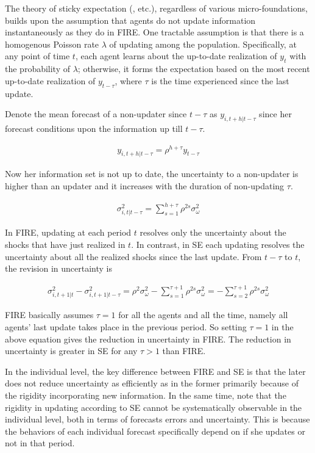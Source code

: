 \documentclass[12pt]{article}
\begin{document}
	The theory of sticky expectation (\citet{mankiw2002sticky}, \citet{carroll2003macroeconomic} etc.), regardless of various micro-foundations, builds upon the assumption that agents do not update information instantaneously as they do in FIRE. One tractable assumption is that there is a homogenous Poisson rate $\lambda$ of updating among the population. Specifically, at any point of time $t$, each agent learns about the up-to-date realization of $y_t$ with the probability of $\lambda$; otherwise, it forms the expectation based on the most recent up-to-date realization of $y_{t-\tau}$, where $\tau$ is the time experienced since the last update. 
	
	Denote the mean forecast of a non-updater since $t-\tau$ as $y_{i,t+h|t-\tau}$ since her forecast conditions upon the information up till $t-\tau$. 
	
	\begin{eqnarray} 
		y_{i,t+h|t-\tau} = \rho^{h+\tau} y_{t-\tau}
	\end{eqnarray}
	
	Now her information set is not up to date, the uncertainty to a non-updater is higher than an updater and it increases with the duration of non-updating $\tau$. 
	
	\begin{eqnarray}\label{VarSEInd}
		\sigma^2_{i,t|t-\tau}= \sum^{h+\tau}_{s=1}\rho^{2s} \sigma^2_{\omega}
	\end{eqnarray}	
	
	In FIRE, updating at each period $t$ resolves only the uncertainty about the shocks that have just realized in $t$. In contrast, in SE each updating resolves the uncertainty about all the realized shocks since the last update. From $t-\tau$ to $t$, the revision in uncertainty is 
	
	\begin{eqnarray}
		\sigma^2_{i,t+1|t} - \sigma^2_{i,t+1|t-\tau} = \rho^{2} \sigma^2_{\omega} - \sum^{\tau+1}_{s=1}\rho^{2s} \sigma^2_{\omega} = -\sum^{\tau+1}_{s=2} \rho^{2s}\sigma^2_{\omega}
	\end{eqnarray}
	
	FIRE basically assumes  $\tau=1$ for all the agents and all the time, namely all agents' last update takes place in the previous period. So setting $\tau =1$ in the above equation gives the reduction in uncertainty in FIRE. The reduction in uncertainty is greater in SE for any $\tau>1$ than FIRE.
	
	In the individual level, the key difference between FIRE and SE is that the later does not reduce uncertainty  as efficiently as in the former primarily because of the rigidity incorporating new information. In the same time, note that the rigidity in updating according to SE cannot be systematically observable in the individual level, both in terms of forecasts errors and uncertainty. This is because the behaviors of each individual forecast specifically depend on if she updates or not in that period. 
	
\end{document}
